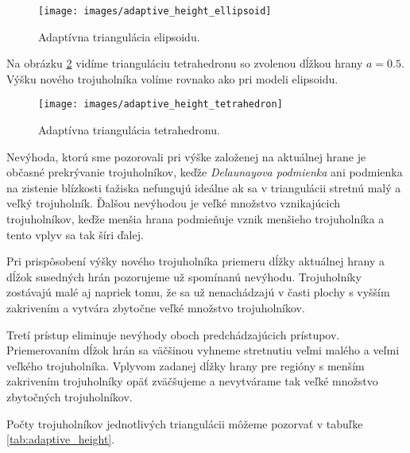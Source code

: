 \begin{figure}
    \centerline{\texttt{[image: images/adaptive\_height\_ellipsoid]}}
    \caption[Adaptívna triangulácia elipsoidu]
    {Adaptívna triangulácia elipsoidu.}
    \label{obr:adaptive_height_ellipsoid}
\end{figure}

Na obrázku \ref{obr:adaptive_height_tetrahedron} vidíme trianguláciu tetrahedronu so zvolenou
dĺžkou hrany $a=0.5$. Výšku nového trojuholníka volíme rovnako ako pri modeli elipsoidu.

\begin{figure}
    \centerline{\texttt{[image: images/adaptive\_height\_tetrahedron]}}
    \caption[Adaptívna triangulácia tetrahedronu]
    {Adaptívna triangulácia tetrahedronu.}
    \label{obr:adaptive_height_tetrahedron}
\end{figure}


\renewcommand{\arraystretch}{1}
\setlength{\fboxsep}{2mm} %
\setlength{\tabcolsep}{4pt}

    Nevýhoda, ktorú sme pozorovali pri výške založenej na aktuálnej hrane je občasné prekrývanie
    trojuholníkov, keďže \textit{Delaunayova podmienka} ani podmienka na zistenie blízkosti
    ťažiska nefungujú ideálne ak sa v triangulácii stretnú malý a veľký trojuholník.
    Ďalšou nevýhodou je veľké množstvo vznikajúcich trojuholníkov, keďže menšia hrana podmieňuje
    vznik menšieho trojuholníka a tento vplyv sa tak šíri ďalej.

    Pri prispôsobení výšky nového trojuholníka priemeru dĺžky aktuálnej hrany a dĺžok susedných 
    hrán pozorujeme už spomínanú nevýhodu. Trojuholníky zostávajú malé aj napriek tomu, že 
    sa už nenachádzajú v časti plochy s vyšším zakrivením a vytvára zbytočne veľké množstvo trojuholníkov.

    Tretí prístup eliminuje nevýhody oboch predchádzajúcich prístupov. Priemerovaním dĺžok hrán sa väčšinou 
    vyhneme stretnutiu veľmi malého a veľmi veľkého trojuholníka. Vplyvom zadanej dĺžky hrany pre 
    regióny s menším zakrivením trojuholníky opäť zväčšujeme a nevytvárame tak veľké množstvo zbytočných 
    trojuholníkov.

    Počty trojuholníkov jednotlivých triangulácii môžeme pozorvať v tabuľke \ref{tab:adaptive_height}.

